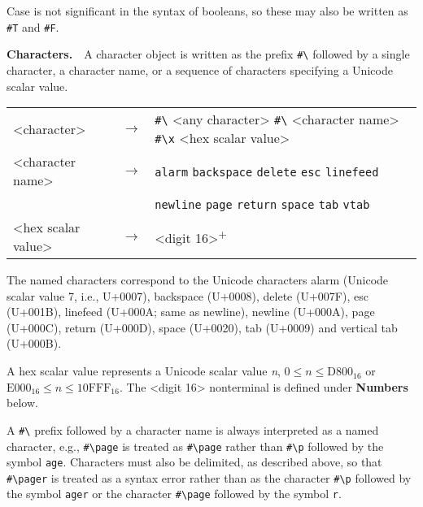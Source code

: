 Case is not significant in the syntax of booleans, so these may also be written
as \texttt{\#{}T} and \texttt{\#{}F}.


\textbf{Characters\label{grammar_grammar_characters}.}  \label{grammar_s15}A character object is written as the prefix \texttt{\#{}\textbackslash{}} followed by a single
character, a character name, or a sequence of characters specifying a
Unicode scalar value.


  
  
  {\footnotesize
\begin{tabular}[H]{lcl}

\textless{}character\textgreater{} & \(\longrightarrow\) & \texttt{\#{}\textbackslash{}} \textless{}any character\textgreater{} \textbar{} \texttt{\#{}\textbackslash{}} \textless{}character name\textgreater{}
                    \textbar{} \texttt{\#{}\textbackslash{}x} \textless{}hex scalar value\textgreater{} \\

\textless{}character name\textgreater{} & \(\longrightarrow\) & \texttt{alarm} \textbar{} \texttt{backspace} \textbar{} \texttt{delete} \textbar{} \texttt{esc} \textbar{}\texttt{linefeed} \\

   & \textbar{} & \texttt{newline} \textbar{} \texttt{page} \textbar{} \texttt{return} \textbar{} \texttt{space} \textbar{} \texttt{tab} \textbar{} \texttt{vtab} \\

\textless{}hex scalar value\textgreater{} & \(\longrightarrow\) & \textless{}digit 16\textgreater{}\textsuperscript{+} \\
\end{tabular}
}


The named characters correspond to the Unicode characters
alarm (Unicode scalar value 7, i.e., U+0007),
backspace (U+0008),
delete (U+007F),
esc (U+001B),
linefeed (U+000A; same as newline),
newline (U+000A),
page (U+000C),
return (U+000D),
space (U+0020),
tab (U+0009) and 
vertical tab (U+000B).


A hex scalar value represents a Unicode scalar value \textit{n},
\(0 \leq n \leq \mathrm{D800_16}\) or
\(\mathrm{E000_16} \leq n \leq \mathrm{10FFF_16}\).
The \textless{}digit 16\textgreater{} nonterminal is defined under \textbf{Numbers} below.


A \texttt{\#{}\textbackslash{}} prefix followed by a character name is always interpreted as
a named character, e.g., \texttt{\#{}\textbackslash{}page} is treated as \texttt{\#{}\textbackslash{}page}
rather than \texttt{\#{}\textbackslash{}p} followed by the symbol \texttt{age}.
Characters must also be delimited, as described above, so that \texttt{\#{}\textbackslash{}pager}
is treated as a syntax error rather than as the character \texttt{\#{}\textbackslash{}p} followed
by the symbol \texttt{ager} or the character \texttt{\#{}\textbackslash{}page} followed by the
symbol \texttt{r}.


